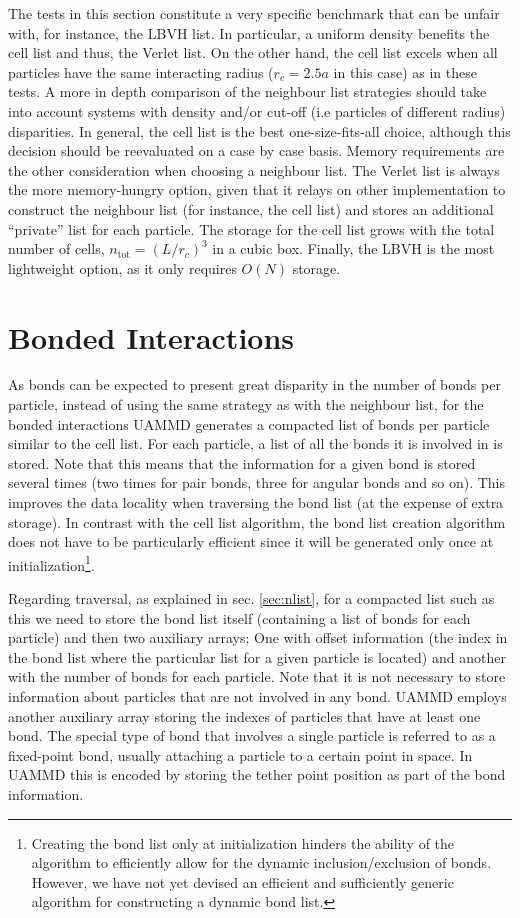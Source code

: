 \documentclass[twoside,openright,titlepage,numbers=noenddot,%
headinclude,footinclude,cleardoublepage=empty,abstract=on,
BCOR=5mm,fontsize=11pt, dvipsnames, paper=b5
]{scrreprt}
\newcommand{\uammd}{\gls{UAMMD}\xspace}
\begin{document}
The tests in this section constitute a very specific benchmark that can be unfair with, for instance, the LBVH list. In particular, a uniform density benefits the cell list and thus, the Verlet list. On the other hand, the cell list excels when all particles have the same interacting radius ($r_c=2.5a$ in this case) as in these tests. A more in depth comparison of the neighbour list strategies should take into account systems with density and/or cut-off (i.e particles of different radius) disparities. In general, the cell list is the best one-size-fits-all choice, although this decision should be reevaluated on a case by case basis.
Memory requirements are the other consideration when choosing a neighbour list. The Verlet list is always the more memory-hungry option, given that it relays on other implementation to construct the neighbour list (for instance, the cell list) and stores an additional ``private'' list for each particle. The storage for the cell list grows with the total number of cells, $n_{\text{tot}}=(L/r_c)^3$ in a cubic box. Finally, the LBVH is the most lightweight option, as it only requires $O(N)$ storage.


\chapter{Bonded Interactions}\label{sec:bonded}

As bonds can be expected to present great disparity in the number of bonds per particle, instead of using the same strategy as with the neighbour list, for the bonded interactions \uammd generates a compacted list of bonds per particle similar to the cell list.
For each particle, a list of all the bonds it is involved in is stored. Note that this means that the information for a given bond is stored several times (two times for pair bonds, three for angular bonds and so on).
This improves the data locality when traversing the bond list (at the expense of extra storage).
In contrast with the cell list algorithm, the bond list creation algorithm does not have to be particularly efficient since it will be generated only once at initialization\footnote{Creating the bond list only at initialization hinders the ability of the algorithm to efficiently allow for the dynamic inclusion/exclusion of bonds. However, we have not yet devised an efficient and sufficiently generic algorithm for constructing a dynamic bond list.}.

Regarding traversal, as explained in sec. \ref{sec:nlist}, for a compacted list such as this we need to store the bond list itself (containing a list of bonds for each particle) and then two auxiliary arrays; One with offset information (the index in the bond list where the particular list for a given particle is located) and another with the number of bonds for each particle.
Note that it is not necessary to store information about particles that are not involved in any bond. UAMMD employs another auxiliary array storing the indexes of particles that have at least one bond.
The special type of bond that involves a single particle is referred to as a fixed-point bond, usually attaching a particle to a certain point in space. In UAMMD this is encoded by storing the tether point position as part of the bond information.
\end{document}
